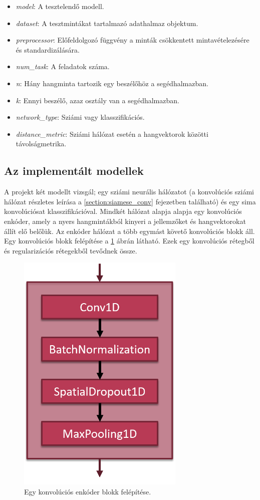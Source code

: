 \begin{itemize}
	\begin{itemize}
		\item  \emph{model}: A tesztelendő modell.
		\item  \emph{dataset}: A tesztmintákat tartalmazó adathalmaz objektum.
		\item  \emph{preprocessor}: Előfeldolgozó függvény a minták csökkentett mintavételezésére és standardizálására.
		\item  \emph{num\_task}: A feladatok száma.
		\item  \emph{n}: Hány hangminta tartozik egy beszélőhöz a segédhalmazban.
		\item  \emph{k}: Ennyi beszélő, azaz osztály van a segédhalmazban.
		\item  \emph{network\_type}: Sziámi vagy klasszifikációs.
		\item  \emph{distance\_metric}: Sziámi hálózat esetén a hangvektorok közötti távolságmetrika.
	\end{itemize}
\end{itemize}

\subsection{Az implementált modellek}

A projekt két modellt vizsgál; egy sziámi neurális hálózatot (a konvolúciós sziámi hálózat részletes leírása a \ref{section:siamese_conv} fejezetben található) és egy sima konvolúciósat klasszifikációval. Mindkét hálózat alapja alapja egy konvolúciós enkóder, amely a nyers hangmintákból kinyeri a jellemzőket és hangvektorokat állít elő belőlük. Az enkóder hálózat a több egymást követő konvolúciós blokk áll. Egy konvolúciós blokk felépítése a \ref{fig:conv_encoder_block} ábrán látható. Ezek egy konvolúciós rétegből és regularizációs
rétegekből tevődnek össze.

\begin{figure}[!ht]
	\centering
	\includegraphics[width=80mm, keepaspectratio]{figures/conv_encoder_block.png}
	\caption{Egy konvolúciós enkóder blokk felépítése.}
	\label{fig:conv_encoder_block}
\end{figure}

